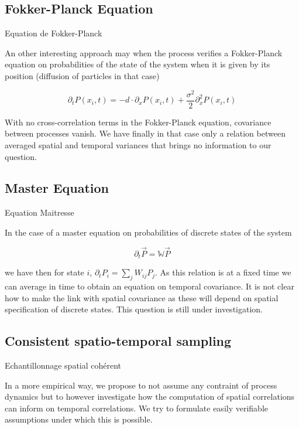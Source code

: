 \subsection{Fokker-Planck Equation}{Equation de Fokker-Planck}

An other interesting approach may when the process verifies a Fokker-Planck equation on probabilities of the state of the system when it is given by its position (diffusion of particles in that case)

\begin{equation}
\partial_t P(x_i,t) = - d \cdot \partial_x P(x_i,t) + \frac{\sigma^2}{2} \partial^2_x P(x_i,t)
\end{equation}

With no cross-correlation terms in the Fokker-Planck equation, covariance between processes vanish. We have finally in that case only a relation between averaged spatial and temporal variances that brings no information to our question.

\subsection{Master Equation}{Equation Maitresse}

In the case of a master equation on probabilities of discrete states of the system

\begin{equation}
\partial_t \vec{P} = \mathbb{W} \vec{P}
\end{equation}

we have then for state $i$, $\partial_t P_i = \sum_j W_{ij}P_j$. As this relation is at a fixed time we can average in time to obtain an equation on temporal covariance. It is not clear how to make the link with spatial covariance as these will depend on spatial specification of discrete states. This question is still under investigation.


\subsection{Consistent spatio-temporal sampling}{Echantillonnage spatial cohérent}

In a more empirical way, we propose to not assume any contraint of process dynamics but to however investigate how the computation of spatial correlations can inform on temporal correlations. We try to formulate easily verifiable assumptions under which this is possible.

